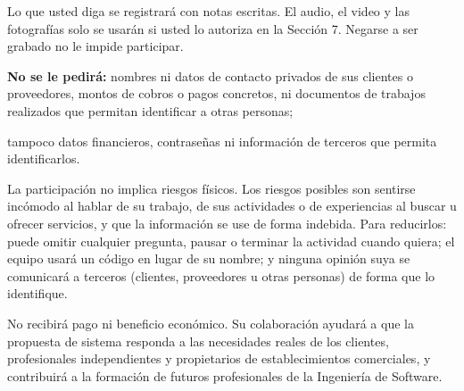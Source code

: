 {Lo que usted diga se registrar\'a con notas escritas. El audio, el video y las fotograf\'ias solo se usar\'an si usted lo autoriza en la Secci\'on 7. Negarse a ser grabado no le impide participar.

\textbf{No se le pedir\'a:} nombres ni datos de contacto privados de sus clientes o proveedores, montos de cobros o pagos concretos, ni documentos de trabajos realizados que permitan identificar a otras personas;
}

\newpage

{\small
tampoco datos financieros, contrase\~nas ni informaci\'on de terceros que permita identificarlos.


La participaci\'on no implica riesgos f\'isicos. Los riesgos posibles son sentirse inc\'omodo al hablar de su trabajo, de sus actividades o de experiencias al buscar u ofrecer servicios, y que la informaci\'on se use de forma indebida. Para reducirlos: puede omitir cualquier pregunta, pausar o terminar la actividad cuando quiera; el equipo usar\'a un c\'odigo en lugar de su nombre; y ninguna opini\'on suya se comunicar\'a a terceros (clientes, proveedores u otras personas) de forma que lo identifique.


No recibir\'a pago ni beneficio econ\'omico. Su colaboraci\'on ayudar\'a a que la propuesta de sistema responda a las necesidades reales de los clientes, profesionales independientes y propietarios de establecimientos comerciales, y contribuir\'a a la formaci\'on de futuros profesionales de la Ingenier\'ia de Software.


}
